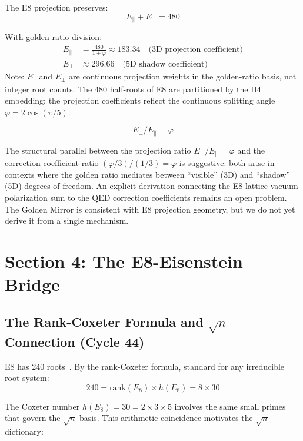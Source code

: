 \documentclass[aps,prd,twocolumn,superscriptaddress,floatfix,nofootinbib]{revtex4-2}
\theoremstyle{definition}
\theoremstyle{remark}
\newcommand{\vp}{\varphi}
\begin{document}
The E8 projection preserves:
\begin{equation}
E_\parallel + E_\perp = 480
\end{equation}

With golden ratio division:
\begin{align}
E_\parallel &= \frac{480}{1 + \vp} \approx 183.34 \quad \text{(3D projection coefficient)} \\
E_\perp &\approx 296.66 \quad \text{(5D shadow coefficient)}
\end{align}
\noindent Note: $E_\parallel$ and $E_\perp$ are continuous projection weights in the golden-ratio basis, not integer root counts. The 480 half-roots of E8 are partitioned by the H4 embedding; the projection coefficients reflect the continuous splitting angle $\vp = 2\cos(\pi/5)$.

\begin{equation}
\boxed{E_\perp / E_\parallel = \vp}
\end{equation}

The structural parallel between the projection ratio $E_\perp/E_\parallel = \vp$ and the correction coefficient ratio $(\vp/3)/(1/3) = \vp$ is suggestive: both arise in contexts where the golden ratio mediates between ``visible'' (3D) and ``shadow'' (5D) degrees of freedom. An explicit derivation connecting the E8 lattice vacuum polarization sum to the QED correction coefficients remains an open problem. The Golden Mirror is consistent with E8 projection geometry, but we do not yet derive it from a single mechanism.

\section{Section 4: The E8-Eisenstein Bridge}

\subsection{The Rank-Coxeter Formula and $\sqrt{n}$ Connection (Cycle 44)}

E8 has 240 roots~\cite{e8}. By the rank-Coxeter formula, standard for any irreducible root system:
\begin{equation}
240 = \mathrm{rank}(E_8) \times h(E_8) = 8 \times 30
\end{equation}

The Coxeter number $h(E_8) = 30 = 2 \times 3 \times 5$ involves the same small primes that
govern the $\sqrt{n}$ basis. This arithmetic coincidence motivates the $\sqrt{n}$ dictionary:
\end{document}
